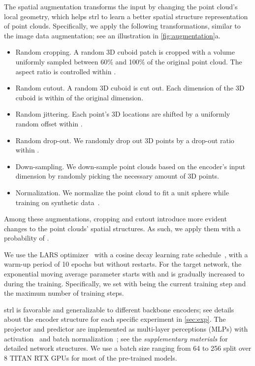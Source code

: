 \documentclass[10pt,twocolumn,letterpaper]{article}
\makeatletter
\renewcommand{\paragraph}{\@startsection{paragraph}{4}{\z@}{0ex \@plus 0ex \@minus 0ex}{-1em}{\hskip\parindent\normalfont\normalsize\bfseries}}
\makeatother
\begin{document}
The spatial augmentation transforms the input by changing the point cloud's local geometry, which helps \ac{strl} to learn a better spatial structure representation of point clouds. Specifically, we apply the following transformations, similar to the image data augmentation; see an illustration in \cref{fig:augmentation}a.
\begin{itemize}[leftmargin=*,noitemsep,nolistsep]
    \item Random cropping. A random 3D cuboid patch is cropped with a volume uniformly sampled between 60\% and 100\% of the original point cloud. The aspect ratio is controlled within .
    \item Random cutout. A random 3D cuboid is cut out. Each dimension of the 3D cuboid is within  of the original dimension. 
    \item Random jittering. Each point's 3D locations are shifted by a uniformly random offset within . 
    \item Random drop-out. We randomly drop out 3D points by a drop-out ratio within .
    \item Down-sampling. We down-sample point clouds based on the encoder's input dimension by randomly picking the necessary amount of 3D points.
    \item Normalization. We normalize the point cloud to fit a unit sphere while training on synthetic data~\cite{chang2015shapenet}.
\end{itemize}

Among these augmentations, cropping and cutout introduce more evident changes to the point clouds' spatial structures. As such, we apply them with a probability of . 

\paragraph{Training}

We use the LARS optimizer~\cite{you2017scaling} with a cosine decay learning rate schedule~\cite{loshchilov2016sgdr}, with a warm-up period of 10 epochs but without restarts. For the target network, the exponential moving average parameter starts with  and is gradually increased to  during the training. Specifically, we set  with  being the current training step and  the maximum number of training steps.

\ac{strl} is favorable and generalizable to different backbone encoders; see details about the encoder structure for each specific experiment in \cref{sec:exp}. The projector and predictor are implemented as multi-layer perceptions (MLPs) with activation~\cite{nair2010rectified} and batch normalization~\cite{ioffe2015batch}; see the \emph{supplementary materials} for detailed network structures. We use a batch size ranging from 64 to 256 split over 8 TITAN RTX GPUs for most of the pre-trained models.
\end{document}
